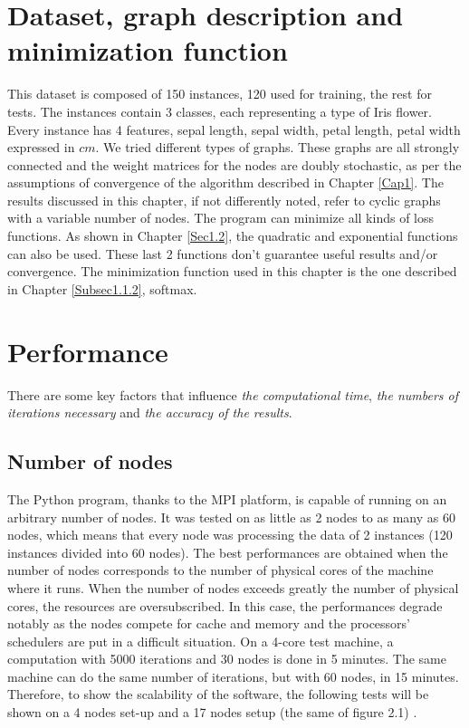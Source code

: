 \documentclass[a4paper,11pt,oneside]{book}
\begin{document}
\section{Dataset, graph description and minimization function} \label{Sec2.1}
This dataset is composed of 150 instances, 120 used for training, the rest for tests. The instances contain 3 classes, each representing a type of Iris flower. Every instance has 4 features, sepal length, sepal width, petal length, petal width expressed in $cm$. We tried different types of graphs. These graphs are all strongly connected and the weight matrices for the nodes are doubly stochastic, as per the assumptions of convergence of the algorithm described in Chapter \ref{Cap1}. The results discussed in this chapter, if not differently noted, refer to cyclic graphs with a variable number of nodes. The program can minimize all kinds of loss functions. As shown in Chapter \ref{Sec1.2}, the quadratic and exponential functions can also be used. These last 2 functions don't guarantee useful results and/or convergence. The minimization function used in this chapter is the one described in Chapter \ref{Subsec1.1.2}, softmax.

\section{Performance} \label{Sec2.2}
There are some key factors that influence \textit{the computational time}, \textit{the numbers of iterations necessary} and \textit{the accuracy of the results}.\\

\subsection{Number of nodes} \label{Subsec2.2.1}
The Python program, thanks to the MPI platform, is capable of running on an arbitrary number of nodes. It was tested on as little as 2 nodes to as many as 60 nodes, which means that every node was processing the data of 2 instances (120 instances divided into 60 nodes). The best performances are obtained when the number of nodes corresponds to the number of physical cores of the machine where it runs. When the number of nodes exceeds greatly the number of physical cores, the resources are oversubscribed. In this case, the performances degrade notably as the nodes compete for cache and memory and the processors' schedulers are put in a difficult situation. On a 4-core test machine, a computation with 5000 iterations and 30 nodes is done in 5 minutes. The same machine can do the same number of iterations, but with 60 nodes, in 15 minutes. Therefore, to show the scalability of the software,  the following tests will be shown on a 4 nodes set-up and a 17 nodes setup (the same of figure 2.1) . \\
\end{document}

